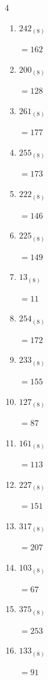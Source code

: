 \begin{multicols}{4}
\begin{enumerate}
  \item $242_{(8)}$

        $=162$

  \item $200_{(8)}$

        $=128$

  \item $261_{(8)}$

        $=177$

  \item $255_{(8)}$

        $=173$

  \item $222_{(8)}$

        $=146$

  \item $225_{(8)}$

        $=149$

  \item $13_{(8)}$

        $=11$

  \item $254_{(8)}$

        $=172$

  \item $233_{(8)}$

        $=155$

\columnbreak %

\resetques

  \item $127_{(8)}$

        $=87$

  \item $161_{(8)}$

        $=113$

  \item $227_{(8)}$

        $=151$

  \item $317_{(8)}$

        $=207$

  \item $103_{(8)}$

        $=67$

  \item $375_{(8)}$

        $=253$

  \item $133_{(8)}$

        $=91$


\end{enumerate}
\end{multicols}
